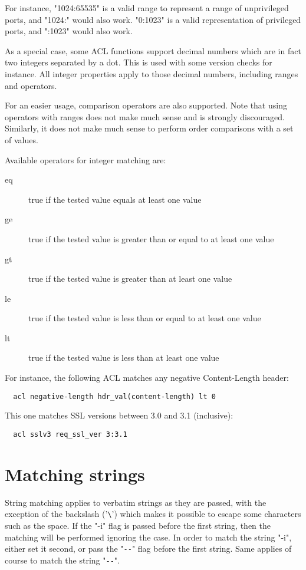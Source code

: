 For instance, "1024:65535" is a valid range to represent a range of
unprivileged ports, and "1024:" would also work. "0:1023" is a valid
representation of privileged ports, and ":1023" would also work.

As a special case, some ACL functions support decimal numbers which are in fact
two integers separated by a dot. This is used with some version checks for
instance. All integer properties apply to those decimal numbers, including
ranges and operators.

For an easier usage, comparison operators are also supported. Note that using
operators with ranges does not make much sense and is strongly discouraged.
Similarly, it does not make much sense to perform order comparisons with a set
of values.

Available operators for integer matching are:

\begin{description}
\item[eq] true if the tested value equals at least one value
\item[ge] true if the tested value is greater than or equal to at least one value
\item[gt] true if the tested value is greater than at least one value
\item[le] true if the tested value is less than or equal to at least one value
\item[lt] true if the tested value is less than at least one value
\end{description}

For instance, the following ACL matches any negative Content-Length header:

\begin{verbatim}
  acl negative-length hdr_val(content-length) lt 0
\end{verbatim}

This one matches SSL versions between 3.0 and 3.1 (inclusive):

\begin{verbatim}
  acl sslv3 req_ssl_ver 3:3.1
\end{verbatim}

\section{Matching strings}
\label{sec:matching_string}

String matching applies to verbatim strings as they are passed, with the
exception of the backslash ('\verb|\|') which makes it possible to escape some
characters such as the space. If the "-i" flag is passed before the first
string, then the matching will be performed ignoring the case. In order
to match the string "-i", either set it second, or pass the "\verb|--|" flag
before the first string. Same applies of course to match the string "\verb|--|".

